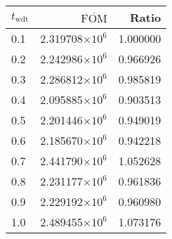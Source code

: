 \begin{tabular}{lrr}
\toprule
$t_{\mathrm{wdt}}$ & $\overline{\mathrm{FOM}}$ &    Ratio \\
\midrule
               0.1 &   2.319708$\times 10^{6}$ & 1.000000 \\
               0.2 &   2.242986$\times 10^{6}$ & 0.966926 \\
               0.3 &   2.286812$\times 10^{6}$ & 0.985819 \\
               0.4 &   2.095885$\times 10^{6}$ & 0.903513 \\
               0.5 &   2.201446$\times 10^{6}$ & 0.949019 \\
               0.6 &   2.185670$\times 10^{6}$ & 0.942218 \\
               0.7 &   2.441790$\times 10^{6}$ & 1.052628 \\
               0.8 &   2.231177$\times 10^{6}$ & 0.961836 \\
               0.9 &   2.229192$\times 10^{6}$ & 0.960980 \\
               1.0 &   2.489455$\times 10^{6}$ & 1.073176 \\
\bottomrule
\end{tabular}
